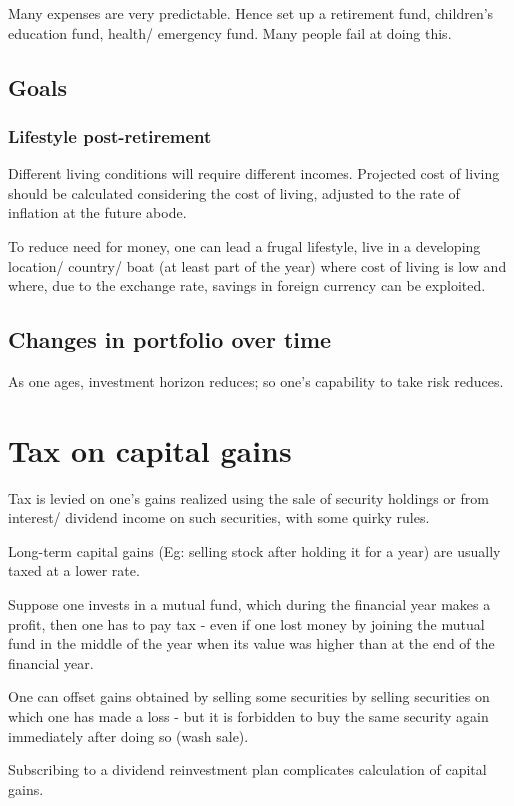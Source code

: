 \documentclass[oneside, article]{memoir}
\begin{document}
Many expenses are very predictable. Hence set up a retirement fund, children's education fund, health/ emergency fund. Many people fail at doing this.

\subsection{Goals}
\subsubsection{Lifestyle post-retirement}
Different living conditions will require different incomes. Projected cost of living should be calculated considering the cost of living, adjusted to the rate of inflation at the future abode.

To reduce need for money, one can lead a frugal lifestyle, live in a developing location/ country/ boat (at least part of the year) where cost of living is low and where, due to the exchange rate, savings in foreign currency can be exploited.

\subsection{Changes in portfolio over time}
As one ages, investment horizon reduces; so one's capability to take risk reduces.

\section{Tax on capital gains}
Tax is levied on one's gains realized using the sale of security holdings or from interest/ dividend income on such securities, with some quirky rules.

Long-term capital gains (Eg: selling stock after holding it for a year) are usually taxed at a lower rate.

Suppose one invests in a mutual fund, which during the financial year makes a profit, then one has to pay tax - even if one lost money by joining the mutual fund in the middle of the year when its value was higher than at the end of the financial year.

One can offset gains obtained by selling some securities by selling securities on which one has made a loss - but it is forbidden to buy the same security again immediately after doing so (wash sale).

Subscribing to a dividend reinvestment plan complicates calculation of capital gains.
\end{document}
